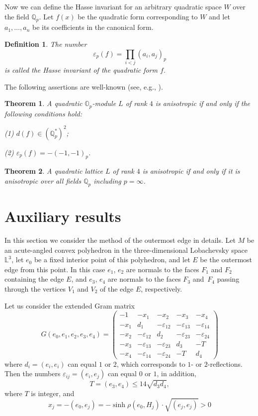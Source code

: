 \documentclass[14pt]{article}
\newtheorem{theorem}{\indent Theorem}[section]
\newtheorem{definition}{\indent Definition}[section]
\begin{document}
Now we can define the Hasse invariant for an arbitrary quadratic
space $W$ over the field $\mathbb{Q}_p $. Let $f (x) $ be the quadratic form corresponding
to $W$ and let $a_1, \ldots, a_ {n}$ be its coefficients in the
canonical form.

\begin{definition}
The number
$$
\varepsilon_p (f) = \prod_{i <j} (a_i, a_j)_p
$$
is called the Hasse invariant of the quadratic form $f$.
\end{definition}

The following assertions are well-known
(see, e.g., \cite[Lemma 2.6, p.~76]{kassels82qf}).

\begin{theorem}\label{anisotr-lemma}
A quadratic $\mathbb{O}_p$-module $L$ of rank $4$
is anisotropic if and only if the following conditions hold:

(1) $ d(f) \in (\mathbb{Q}^*_ p)^2$;

(2) $\varepsilon_p (f) = - (- 1, -1)_p$.
\end{theorem}

\begin{theorem}
A quadratic lattice $L$ of rank $4$
is anisotropic if and only if it is
anisotropic over all fields $\mathbb{Q}_p $ including $p = \infty$.
\end{theorem}



\section{Auxiliary results}\label{osn-utv}

In this section we consider the method of the outermost edge in details. Let
$M$ be an acute-angled convex polyhedron in the three-dimensional
Lobachevsky space
$\mathbb{L}^3$, let $e_0$ be a fixed interior point of this
polyhedron, and let $E$ be the outermost edge from this point.
In this case $e_1$, $e_2$ are normals to the faces $F_1$ and $F_2$ containing the
 edge $E$, and $e_3$, $e_4$ are normals to the faces  $F_3$ and~$F_4$
passing through the vertices $V_1$ and $V_2$ of the edge $E$, respectively.

Let us consider the extended
Gram matrix
$$
G(e_0, e_1, e_2, e_3, e_4) =
\begin{pmatrix}
-1 & -x_1 & -x_2 & -x_3 & -x_4\\
-x_1 & d_1 & -\varepsilon_{12} & -\varepsilon_{13} & -\varepsilon_{14}\\
-x_2 & -\varepsilon_{12} & d_2 & -\varepsilon_{23} & -\varepsilon_{24}\\
-x_3 & -\varepsilon_{13} & -\varepsilon_{23} & d_3 & -T\\
-x_4 & -\varepsilon_{14} & -\varepsilon_{24} & -T & d_4
\end{pmatrix}
$$
where $d_i = (e_i, e_i)$ can equal $1$ or $2$, which corresponds to $1$- or
$2$-reflections. Then the numbers
$\varepsilon_{ij} = (e_i, e_j)$ can equal $0$ or $1$,  in addition,
 $$T = (e_3, e_4) \le 14 \sqrt{d_3 d_4},$$
 where $T$ is integer,
 and
$$x_j = -(e_0, e_j) = - \sinh \rho (e_0, H_j) \cdot \sqrt{(e_j, e_j)} > 0$$
\end{document}
